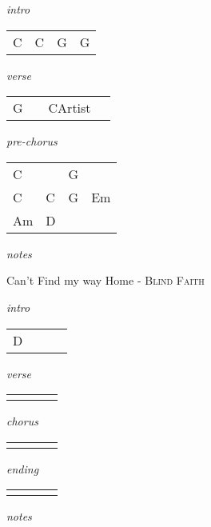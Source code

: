 \documentclass[12pt]{article}
\begin{document}
\huge
\textit{intro}

\begin{tabular}{|P{1.25in}|P{1.25in}|P{1.25in}|P{1.25in}|}
  C  & C  &  G &  G \\
\end{tabular}

\textit{verse}

\begin{tabular}{|P{1.25in}|P{1.25in}|P{1.25in}|P{1.25in}|}
  G  &   & CArtist  &   \\
\end{tabular}

\textit{pre-chorus}

\begin{tabular}{|P{1.25in}|P{1.25in}|P{1.25in}|P{1.25in}|}
  C  &   & G  &   \\
  C  & C  & G &  Em \\
  Am & D & & \\
\end{tabular}

\textit{notes}

\newpage

{\Huge Can't Find my way Home} {\huge - \textsc{Blind Faith}}

\huge
\textit{intro}

\begin{tabular}{|P{1.25in}|P{1.25in}|P{1.25in}|P{1.25in}|}
  D &   &   &   \\
\end{tabular}

\textit{verse}

\begin{tabular}{|P{1.25in}|P{1.25in}|P{1.25in}|P{1.25in}|}
    &   &   &   \\
\end{tabular}

\textit{chorus}

\begin{tabular}{|P{1.25in}|P{1.25in}|P{1.25in}|P{1.25in}|}
    &   &   &   \\
\end{tabular}

\textit{ending}

\begin{tabular}{|P{1.25in}|P{1.25in}|P{1.25in}|P{1.25in}|}
    &   &   &   \\
\end{tabular}

\textit{notes}
\end{document}
